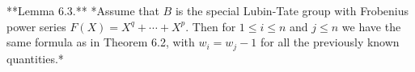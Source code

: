 **Lemma 6.3.** *Assume that $B$ is the special Lubin-Tate group with Frobenius power series $F(X) = X^q + \cdots + X^{p}$. Then for $1 \le i \le n$ and $j \le n$ we have the same formula as in Theorem 6.2, with $w_i = w_j - 1$ for all the previously known quantities.*

